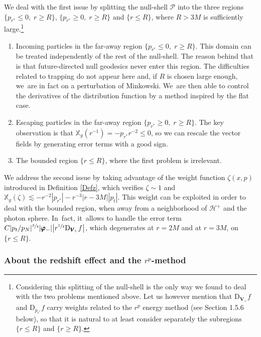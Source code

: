 \documentclass[10pt]{amsart}
\theoremstyle{plain}
\theoremstyle{definition}
\newcommand\T{{\mathbb{X}}}
\begin{document}
We deal with the first issue by splitting the null-shell $\mathcal{P}$ into the three regions $\{ p_{r^*} \leq 0, \; r \geq R \}$, $\{ p_{r^*} \geq 0, \; r \geq R \}$ and $\{ r \leq R \}$, where $R > 3M$ is sufficiently large.\footnote{ Considering this splitting of the null-shell is the only way we found to deal with the two problems mentioned above. Let us however mention that $\mathrm{D}_{\pmb{V}_{\!+}}f$ and $ \mathrm{D}_{p_{r^*}}f$ carry weights related to the $r^p$ energy method (see Section 1.5.6 below), so that it is natural to at least consider separately the subregions $\{ r \leq R \}$ and $\{ r \geq R \}$.}
\begin{enumerate}
\item Incoming particles in the far-away region $\{ p_{r^*} \leq 0, \; r \geq R \}$. This domain can be treated independently of the rest of the null-shell. The reason behind that is that future-directed null geodesics never enter this region. The difficulties related to trapping do not appear here and, if $R$ is chosen large enough, we~are in fact on a perturbation of Minkowski. We~are then able to control the derivatives of the distribution function by a method inspired by the flat case.
\item Escaping particles in the far-away region $\{ p_{r^*} \geq 0, \; r \geq R \}$. The key observation is that $\T_g(r^{-1})= -p_{r^*} r^{-2} \leq 0$, so we can rescale the vector fields by generating error terms with a good sign.
\item The bounded region $\{ r \leq R \}$, where the first problem is irrelevant.
\end{enumerate}
We address the second issue by taking advantage of the weight function $\zeta(x,p)$ introduced in Definition \ref{Defz}, which verifies $\zeta \sim 1$ and $\T_g (\zeta) \lesssim -r^{-2}|p_{r^*}|-r^{-3}|r-3M| |p_t|$. This weight can be exploited in order to deal with the bounded region, when away from a neighborhood of $\mathcal{H}^+$ and the photon sphere. In~fact, it~allows to handle the error term $C|p_t/p_N|^{\sfrac{3}{4}}|\pmb{\varphi}_-| \big|r^{\sfrac{1}{4}} \mathrm{D}_{\pmb{V}_{\!+}} f \big|$, which degenerates at $r=2M$ and at $r=3M$, on $\{ r \leq R \}$.

\subsubsection{About the redshift effect and the $r^p$-method}\label{Rqintrored}
\end{document}
